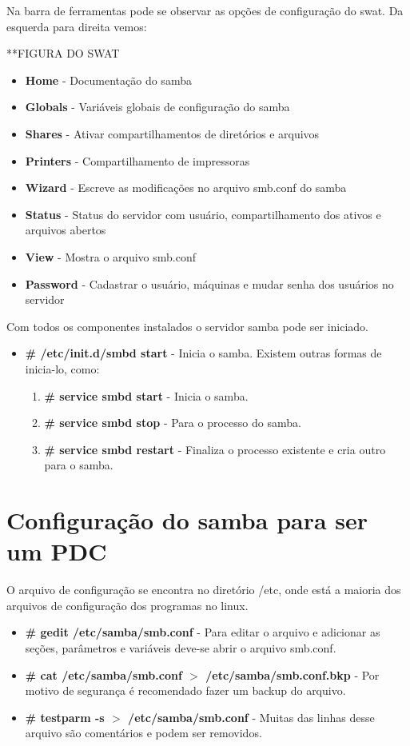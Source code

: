 Na barra de ferramentas pode se observar as opções de configuração do swat. Da esquerda para direita vemos:

**FIGURA DO SWAT

\begin{itemize}
    \item \textbf{Home} - Documentação do samba
    \item \textbf{Globals} - Variáveis globais de configuração do samba
    \item \textbf{Shares} - Ativar compartilhamentos de diretórios e arquivos
    \item \textbf{Printers} - Compartilhamento de impressoras
    \item \textbf{Wizard} - Escreve as modificações no arquivo smb.conf do samba
    \item \textbf{Status} - Status do servidor com usuário, compartilhamento dos ativos e arquivos abertos
    \item \textbf{View} - Mostra o arquivo smb.conf
    \item \textbf{Password} - Cadastrar o usuário, máquinas e mudar senha dos usuários no servidor
\end{itemize}

Com todos os componentes instalados o servidor samba pode ser iniciado.

\begin{itemize}
	\item \textbf{\# /etc/init.d/smbd start} - Inicia o samba. Existem outras formas de inicia-lo, como:
		\begin{enumerate}
			\item \textbf{\# service smbd start} - Inicia o samba.
			\item \textbf{\# service smbd stop} - Para o processo do samba.
			\item \textbf{\# service smbd restart} - Finaliza o processo existente e cria outro para o samba.
		\end{enumerate}
\end{itemize}

\section{Configuração do samba para ser um PDC}

O arquivo de configuração se encontra no diretório /etc, onde está a maioria dos arquivos de configuração dos programas no linux.

\begin{itemize}
	\item \textbf{\# gedit /etc/samba/smb.conf} - Para editar o arquivo e adicionar as seções, parâmetros e variáveis deve-se abrir o arquivo smb.conf.
	\item \textbf{\# cat /etc/samba/smb.conf $>$ /etc/samba/smb.conf.bkp} - Por motivo de segurança é recomendado fazer um backup do arquivo.
	\item \textbf{\# testparm -s $>$ /etc/samba/smb.conf} - Muitas das linhas desse arquivo são comentários e podem ser removidos.
\end{itemize}



